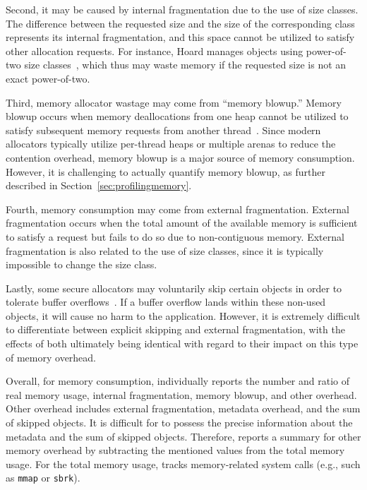 Second, it may be caused by internal fragmentation due to the use of size classes.  The difference between the requested size and the size of the corresponding class represents its internal fragmentation, and this space cannot be utilized to satisfy other allocation requests. For instance, Hoard manages objects using power-of-two size classes~\citep{Hoard}, which thus may waste memory if the requested size is not an exact power-of-two. 
 
Third, memory allocator wastage may come from ``memory blowup.'' Memory blowup occurs when memory deallocations from one heap cannot be utilized to satisfy subsequent memory requests from another thread~\cite{Hoard}. 
Since modern allocators typically utilize per-thread heaps or multiple arenas to reduce the contention overhead, memory blowup is a major source of memory consumption. However, it is challenging to actually quantify memory blowup, as further described in Section~\ref{sec:profilingmemory}.   

Fourth, memory consumption may come from external fragmentation. External fragmentation occurs when the total amount of the available memory is sufficient to satisfy a request but fails to do so due to  non-contiguous memory. External fragmentation is also related to the use of size classes, 
since it is typically impossible to change the size class.  

 Lastly, some secure allocators may voluntarily skip certain objects in order to tolerate buffer overflows~\citep{DieHard, DieHarder, Guarder}. If a buffer overflow lands within these non-used objects, it will cause no harm to the application. However, it is extremely difficult to differentiate between explicit skipping and external fragmentation, with the effects of both ultimately being identical with regard to their impact on this type of memory overhead. 

Overall, for memory consumption, \MP{} individually reports the number and ratio of real memory usage, internal fragmentation, memory blowup, and other overhead. Other overhead includes external fragmentation, metadata overhead, and the sum of skipped objects. It is difficult for \MP{} to possess the precise information about the metadata and the sum of skipped objects. Therefore, \MP{} reports a summary for other memory overhead by subtracting the mentioned values from the total memory usage. For the total memory usage, \MP{} tracks memory-related system calls (e.g., such as \texttt{mmap} or \texttt{sbrk}). 



